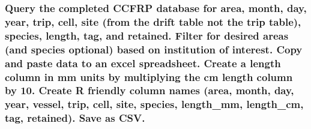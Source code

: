 \documentclass[
]{article}
\begin{document}
\hypertarget{query-the-completed-ccfrp-database-for-area-month-day-year-trip-cell-site-from-the-drift-table-not-the-trip-table-species-length-tag-and-retained.-filter-for-desired-areas-and-species-optional-based-on-institution-of-interest.-copy-and-paste-data-to-an-excel-spreadsheet.-create-a-length-column-in-mm-units-by-multiplying-the-cm-length-column-by-10.-create-r-friendly-column-names-area-month-day-year-vessel-trip-cell-site-species-length_mm-length_cm-tag-retained.-save-as-csv.}{%
\subsubsection{Query the completed CCFRP database for area, month, day, year, trip, cell, site (from the drift table not the trip table), species, length, tag, and retained. Filter for desired areas (and species optional) based on institution of interest. Copy and paste data to an excel spreadsheet. Create a length column in mm units by multiplying the cm length column by 10. Create R friendly column names (area, month, day, year, vessel, trip, cell, site, species, length\_mm, length\_cm, tag, retained). Save as CSV.}\label{query-the-completed-ccfrp-database-for-area-month-day-year-trip-cell-site-from-the-drift-table-not-the-trip-table-species-length-tag-and-retained.-filter-for-desired-areas-and-species-optional-based-on-institution-of-interest.-copy-and-paste-data-to-an-excel-spreadsheet.-create-a-length-column-in-mm-units-by-multiplying-the-cm-length-column-by-10.-create-r-friendly-column-names-area-month-day-year-vessel-trip-cell-site-species-length_mm-length_cm-tag-retained.-save-as-csv.}}
\end{document}
